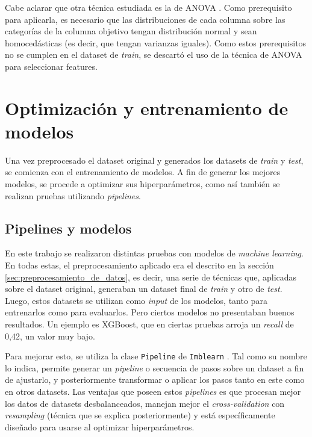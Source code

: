 Cabe aclarar que otra técnica estudiada es la de ANOVA \citep{article:anova}. Como prerequisito para aplicarla, es necesario que las distribuciones de cada columna sobre las categorías de la columna objetivo tengan distribución normal y sean homocedásticas (es decir, que tengan varianzas iguales). Como estos prerequisitos no se cumplen en el dataset de \textit{train}, se descartó el uso de la técnica de ANOVA para seleccionar features.

\section{Optimización y entrenamiento de modelos}
\label{sec:optimizacion_y_training}

Una vez preprocesado el dataset original y generados los datasets de \textit{train} y \textit{test}, se comienza con el entrenamiento de modelos. A fin de generar los mejores modelos, se procede a optimizar sus hiperparámetros, como así también se realizan pruebas utilizando \textit{pipelines}.

\subsection{Pipelines y modelos}
\label{sec:pipelines_y_modelos}

En este trabajo se realizaron distintas pruebas con modelos de \textit{machine learning}. En todas estas, el preprocesamiento aplicado era el descrito en la sección \ref{sec:preprocesamiento_de_datos}, es decir, una serie de técnicas que, aplicadas sobre el dataset original, generaban un dataset final de \textit{train} y otro de \textit{test}. Luego, estos datasets se utilizan como \textit{input} de los modelos, tanto para entrenarlos como para evaluarlos. Pero ciertos modelos no presentaban buenos resultados. Un ejemplo es XGBoost, que en ciertas pruebas arroja un \textit{recall} de 0,42, un valor muy bajo.

Para mejorar esto, se utiliza la clase \texttt{Pipeline} \citep{WEBSITE:imblearn-pipeline} de \texttt{Imblearn} \citep{WEBSITE:imblearn}. Tal como su nombre lo indica, permite generar un \textit{pipeline} o secuencia de pasos sobre un dataset a fin de ajustarlo, y posteriormente transformar o aplicar los pasos tanto en este como en otros datasets. Las ventajas que poseen estos \textit{pipelines} es que procesan mejor los datos de datasets desbalanceados, manejan mejor el \textit{cross-validation} con \textit{resampling} (técnica que se explica posteriormente) y está específicamente diseñado para usarse al optimizar hiperparámetros.

